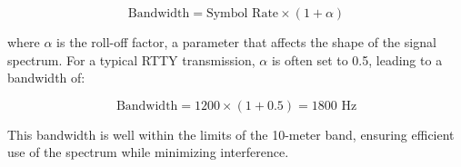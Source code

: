\[
\text{Bandwidth} = \text{Symbol Rate} \times (1 + \alpha)
\]

where \(\alpha\) is the roll-off factor, a parameter that affects the shape of the signal spectrum. For a typical RTTY transmission, \(\alpha\) is often set to 0.5, leading to a bandwidth of:

\[
\text{Bandwidth} = 1200 \times (1 + 0.5) = 1800 \text{ Hz}
\]

This bandwidth is well within the limits of the 10-meter band, ensuring efficient use of the spectrum while minimizing interference.

